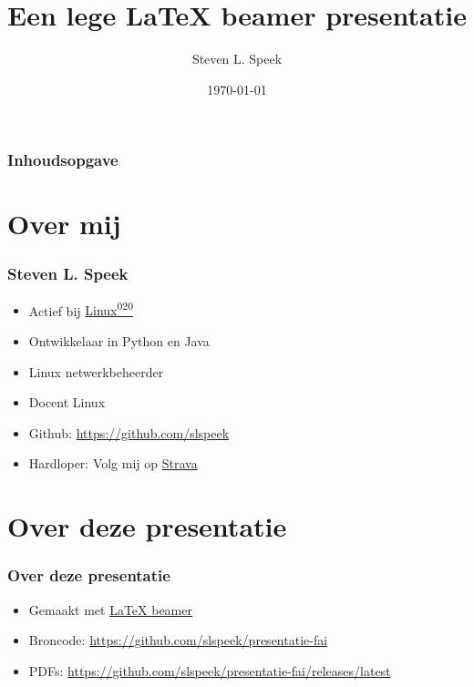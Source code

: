 \documentclass{beamer}
\title[\LaTeX{} beamer sjabloon] %
{Een lege \LaTeX{} beamer presentatie}
\author[S.L.Speek] %
{Steven L. Speek}
\institute[NLLGG] %
{
  Nederlandse Linux Gebruikers Groep 
}
\date[\today{}] %
{\today{}}
\begin{document}
\frame{\titlepage}


\begin{frame}
\frametitle{Inhoudsopgave}
\tableofcontents
\end{frame}


\section{Over mij}

\begin{frame}
\frametitle{Steven L. Speek}
\begin{itemize}
  \item Actief bij \href{https://linux020.nl/}{Linux\textsuperscript{020}}
  \item Ontwikkelaar in Python en Java  
  \item Linux netwerkbeheerder
  \item Docent Linux
  \item Github: \url{https://github.com/slspeek}
  \item Hardloper: Volg mij op \href{https://www.strava.com/athletes/123214921}{Strava}
\end{itemize}

\end{frame}
\section{Over deze presentatie}

\begin{frame}
\frametitle{Over deze presentatie}
\begin{itemize}
  \item Gemaakt met \href{https://nl.mirrors.cicku.me/ctan/macros/latex/contrib/beamer/doc/beameruserguide.pdf}{\LaTeX{} beamer}
  \item Broncode: \url{https://github.com/slspeek/presentatie-fai}
  \item PDFs: \url{https://github.com/slspeek/presentatie-fai/releases/latest}
\end{itemize}

\end{frame}
\end{document}
